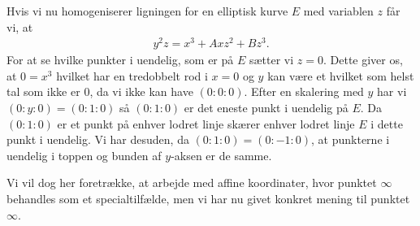 Hvis vi nu homogeniserer ligningen for en elliptisk kurve $E$ med variablen $z$ får vi, at
\begin{align*}
\label{homogeniseret_weierstrass}
	y^2 z = x^3 + Ax z^2 + B z^3.
\end{align*} 
For at se hvilke punkter i uendelig, som er på $E$ sætter vi $z=0$. Dette giver os, at $0 = x^3$ hvilket har en tredobbelt rod i $x=0$ og $y$ kan være et hvilket som helst tal som ikke er $0$, da vi ikke kan have $(0 : 0 : 0)$. 
Efter en skalering med $y$ har vi $(0 : y : 0) = (0 : 1 : 0)$ så $(0 : 1 : 0)$ er det eneste punkt i uendelig på $E$. Da $(0 : 1 : 0)$ er et punkt på enhver lodret linje skærer enhver lodret linje $E$ i dette punkt i uendelig. Vi har desuden, da $(0 : 1 : 0) = (0 : -1 : 0)$, at punkterne i uendelig i toppen og bunden af $y$-aksen er de samme.

Vi vil dog her foretrække, at arbejde med affine koordinater, hvor punktet $\infty$ behandles som et specialtilfælde, men vi har nu givet konkret mening til punktet $\infty$.

